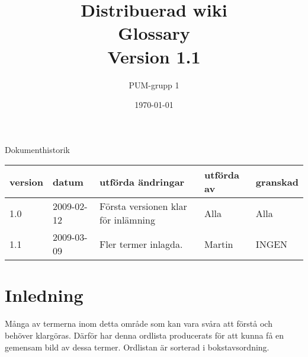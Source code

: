 

\ifpdf
\else
\fi

\title{Distribuerad wiki \\ Glossary \\ Version 1.1}
\author{PUM-grupp 1}
\date{\today}



\maketitle\thispagestyle{empty}

\newpage

{\centering \Large{Dokumenthistorik\\}}

\vspace{10pt}
\begin{tabularx}{\textwidth}{ |l|l|X|l|l| }
  \hline
    \textbf{version} & \textbf{datum} & \textbf{utförda ändringar} & \textbf{utförda av} & \textbf{granskad} \\
	\hline 
  1.0 & 2009-02-12 &  Första versionen klar för inlämning  & Alla & Alla   \\
  \hline 1.1 & 2009-03-09 & Fler termer inlagda. & Martin & INGEN \\
  \hline
\end{tabularx}

\newpage

\setcounter{tocdepth}{2}
\tableofcontents
\newpage


\section{Inledning}

Många av termerna inom detta område som kan vara svåra att förstå och behöver klargöras. Därför har denna ordlista producerats för att kunna få en gemensam bild av dessa termer. Ordlistan är sorterad i bokstavsordning.

